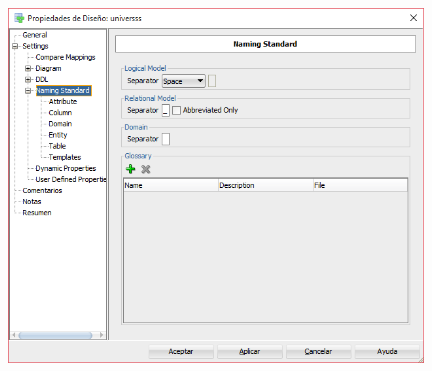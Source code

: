 \documentclass[a4paper,openright,12pt]{book}
\begin{document}
\includegraphics[width=11cm]{./images/5-1 Ejercicio 4/2.png}\\
\end{document}
